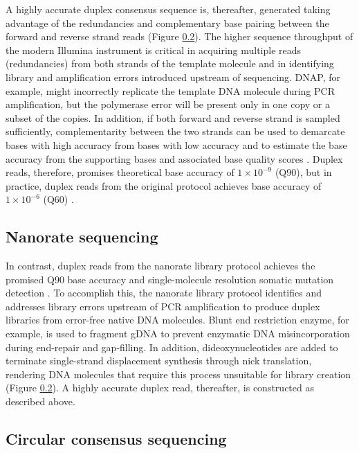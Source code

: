 A highly accurate duplex consensus sequence is, thereafter, generated taking advantage of the redundancies and complementary base pairing between the forward and reverse strand reads (Figure \ref{}). The higher sequence throughput of the modern Illumina instrument is critical in acquiring multiple reads (redundancies) from both strands of the template molecule and in identifying library and amplification errors introduced upstream of sequencing. DNAP, for example, might incorrectly replicate the template DNA molecule during PCR amplification, but the polymerase error will be present only in one copy or a subset of the copies. In addition, if both forward and reverse strand is sampled sufficiently, complementarity between the two strands can be used to demarcate bases with high accuracy from bases with low accuracy \cite{Schmitt2012-yr} and to estimate the base accuracy from the supporting bases and associated base quality scores \cite{Abascal2021-pk}. Duplex reads, therefore, promises theoretical base accuracy of $1 \times 10^{-9}$ (Q90), but in practice, duplex reads from the original protocol achieves base accuracy of $1 \times 10^{-6}$ (Q60) \cite{Schmitt2012-yr}.

\subsection{Nanorate sequencing}

In contrast, duplex reads from the nanorate library protocol achieves the promised Q90 base accuracy and single-molecule resolution somatic mutation detection \cite{Abascal2021-pk}. To accomplish this, the nanorate library protocol identifies and addresses library errors upstream of PCR amplification to produce duplex libraries from error-free native DNA molecules. Blunt end restriction enzyme, for example, is used to fragment gDNA to prevent enzymatic DNA misincorporation during end-repair and gap-filling. In addition, dideoxynucleotides are added to terminate single-strand displacement synthesis through nick translation, rendering DNA molecules that require this process unsuitable for library creation (Figure \ref{}). A highly accurate duplex read, thereafter, is constructed as described above. 

\subsection{Circular consensus sequencing}


